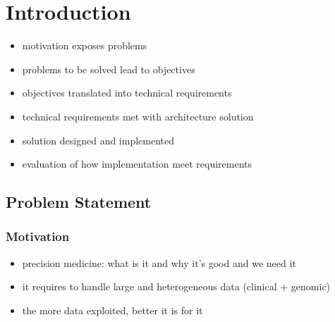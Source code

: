 

\chapter{Introduction}

\begin{itemize}
    \item motivation exposes problems
    \item problems to be solved lead to objectives
    \item objectives translated into technical requirements
    \item technical requirements met with architecture solution
    \item solution designed and implemented
    \item evaluation of how implementation meet requirements
\end{itemize}

\section{Problem Statement}
\label{sec:problem}

\subsection*{Motivation}

\begin{itemize}
    \item precision medicine: what is it and why it's good and we need it
    \item it requires to handle large and heterogeneous data (clinical + genomic)
    \item the more data exploited, better it is for it
\end{itemize}


